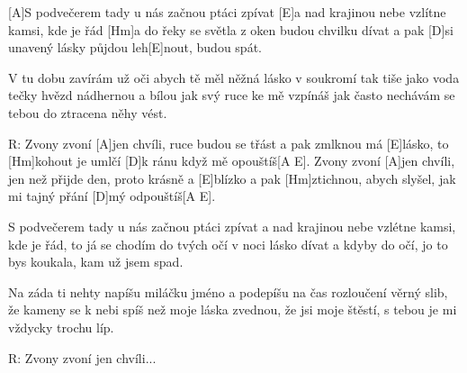 
[A]S podvečerem tady u nás začnou ptáci zpívat
[E]a nad krajinou nebe vzlítne kamsi, kde je řád
[Hm]a do řeky se světla z oken budou chvilku dívat
a pak [D]si unavený lásky půjdou leh[E]nout, budou spát.

V tu dobu zavírám už oči abych tě měl něžná lásko
v soukromí tak tiše jako voda tečky hvězd
nádhernou a bílou jak svý ruce ke mě vzpínáš
jak často nechávám se tebou do ztracena něhy vést.


R: Zvony zvoní [A]jen chvíli, ruce budou se třást
a pak zmlknou má [E]lásko,
to [Hm]kohout je umlčí [D]k ránu když mě opouštíš[A E].
Zvony zvoní [A]jen chvíli, jen než přijde den,
proto krásně a [E]blízko
a pak [Hm]ztichnou, abych slyšel,
jak mi tajný přání [D]mý odpouštíš[A E].

S podvečerem tady u nás začnou ptáci zpívat
a nad krajinou nebe vzlétne kamsi, kde je řád,
to já se chodím do tvých očí v noci lásko dívat
a kdyby do očí, jo to bys koukala, kam už jsem spad.

Na záda ti nehty napíšu miláčku jméno
a podepíšu na čas rozloučení věrný slib,
že kameny se k nebi spíš než moje láska zvednou,
že jsi moje štěstí, s tebou je mi vždycky trochu líp.

R: Zvony zvoní jen chvíli...